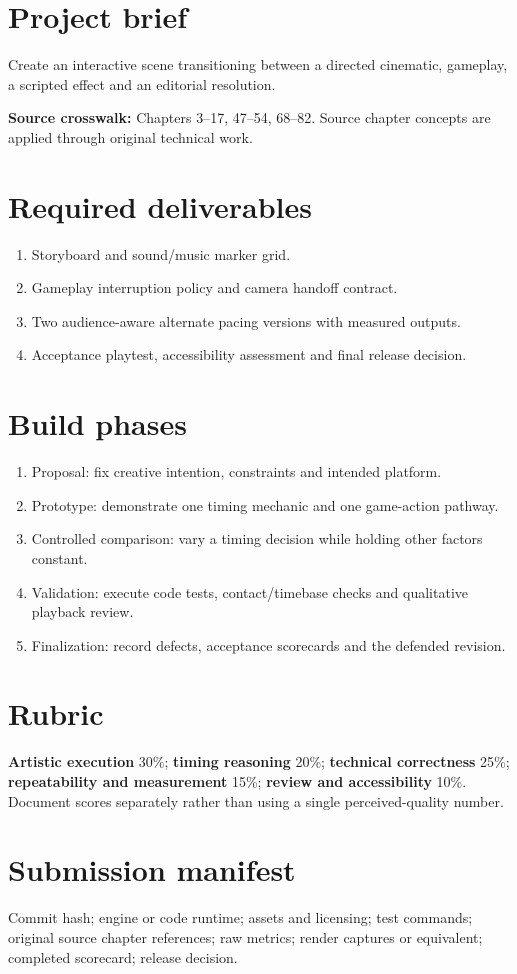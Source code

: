 \documentclass[10pt,letterpaper]{article}
\begin{document}
\makedoctitle
\makedocsummary
\tableofcontents\clearpage
\section{Project brief}
Create an interactive scene transitioning between a directed cinematic, gameplay, a scripted effect and an editorial resolution.\par\textbf{Source crosswalk:} Chapters 3--17, 47--54, 68--82. Source chapter concepts are applied through original technical work.
\section{Required deliverables}
\begin{enumerate}
\item Storyboard and sound/music marker grid.
\item Gameplay interruption policy and camera handoff contract.
\item Two audience-aware alternate pacing versions with measured outputs.
\item Acceptance playtest, accessibility assessment and final release decision.
\end{enumerate}
\section{Build phases}
\begin{enumerate}
\item Proposal: fix creative intention, constraints and intended platform.
\item Prototype: demonstrate one timing mechanic and one game-action pathway.
\item Controlled comparison: vary a timing decision while holding other factors constant.
\item Validation: execute code tests, contact/timebase checks and qualitative playback review.
\item Finalization: record defects, acceptance scorecards and the defended revision.
\end{enumerate}
\section{Rubric}
\textbf{Artistic execution} 30\%; \textbf{timing reasoning} 20\%; \textbf{technical correctness} 25\%; \textbf{repeatability and measurement} 15\%; \textbf{review and accessibility} 10\%. Document scores separately rather than using a single perceived-quality number.
\section{Submission manifest}
Commit hash; engine or code runtime; assets and licensing; test commands; original source chapter references; raw metrics; render captures or equivalent; completed scorecard; release decision.
\end{document}
